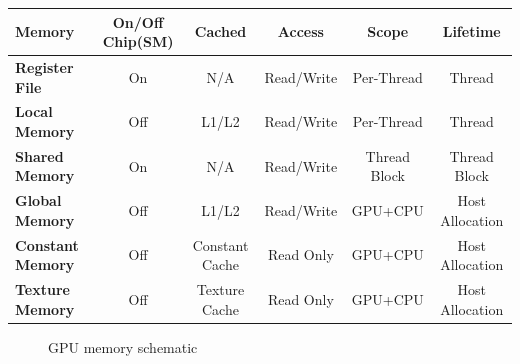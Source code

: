 \begin{table}[]
	\begin{tabular}{|l|c|c|c|c|c|}
		\hline
		\textbf{Memory}          & \textbf{On/Off Chip(SM)} & \textbf{Cached} & \textbf{Access} & \textbf{Scope} & \textbf{Lifetime} \\ \hline
		\textbf{Register File}  & On                   & N/A             & Read/Write      & Per-Thread     & Thread            \\ \hline
		\textbf{Local Memory}    & Off                  & L1/L2           & Read/Write      & Per-Thread     & Thread            \\ \hline
		\textbf{Shared Memory}   & On                   & N/A             & Read/Write      & Thread Block   & Thread Block      \\ \hline
		\textbf{Global Memory}   & Off                  & L1/L2           & Read/Write      & GPU+CPU        & Host Allocation   \\ \hline
		\textbf{Constant Memory} & Off                  & Constant Cache  & Read Only       & GPU+CPU        & Host Allocation   \\ \hline
		\textbf{Texture Memory}  & Off                  & Texture Cache   & Read Only       & GPU+CPU        & Host Allocation   \\ \hline
	\end{tabular}
	\centering
	\label{alg-gpu-mem}
\end{table}

\begin{figure}[H]
	\centering
	\caption{GPU memory schematic}
	\label{fig:hw-memory-schematic}
\end{figure}

